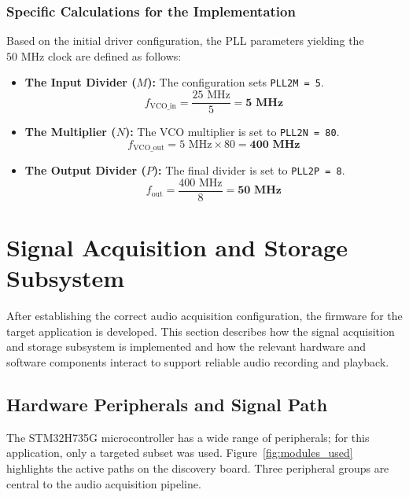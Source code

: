 \subsubsection{Specific Calculations for the Implementation}

Based on the initial driver configuration, the PLL parameters yielding the $50\text{ MHz}$ clock are defined as follows:

\begin{itemize}
    \item \textbf{The Input Divider ($M$):} The configuration sets \texttt{PLL2M = 5}.
    \begin{equation*}
        f_{\text{VCO\_in}} = \frac{25\text{ MHz}}{5} = \mathbf{5\text{ MHz}}
    \end{equation*}

    \item \textbf{The Multiplier ($N$):} The VCO multiplier is set to \texttt{PLL2N = 80}.
    \begin{equation*}
        f_{\text{VCO\_out}} = 5\text{ MHz} \times 80 = \mathbf{400\text{ MHz}}
    \end{equation*}

    \item \textbf{The Output Divider ($P$):} The final divider is set to \texttt{PLL2P = 8}.
    \begin{equation*}
        f_{\text{out}} = \frac{400\text{ MHz}}{8} = \mathbf{50\text{ MHz}}
    \end{equation*}
\end{itemize}

\section{Signal Acquisition and Storage Subsystem}
\label{sec:firmware_impl}

After establishing the correct audio acquisition configuration, the firmware for the target application is developed. This section describes how the signal acquisition and storage subsystem is implemented and how the relevant hardware and software components interact to support reliable audio recording and playback.

\subsection{Hardware Peripherals and Signal Path}
The STM32H735G microcontroller has a wide range of peripherals; for this application, only a targeted subset was used. Figure~\ref{fig:modules_used} highlights the active paths on the discovery board. Three peripheral groups are central to the audio acquisition pipeline.

